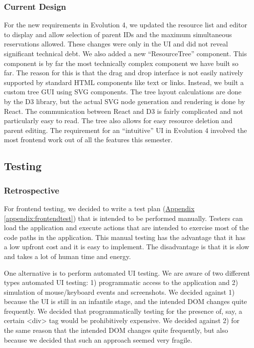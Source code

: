 \documentclass[12pt]{article}
\begin{document}
\subsubsection{Current Design}
For the new requirements in Evolution 4, we updated the resource list and editor to display and allow selection of parent IDs and the maximum simultaneous reservations allowed. These changes were only in the UI and did not reveal significant technical debt. We also added a new ``ResourceTree'' component. This component is by far the most technically complex component we have built so far. The reason for this is that the drag and drop interface is not easily natively supported by standard HTML components like text or links. Instead, we built a custom tree GUI using SVG components. The tree layout calculations are done by the D3 library, but the actual SVG node generation and rendering is done by React. The communication between React and D3 is fairly complicated and not particularly easy to read. The tree also allows for easy resource deletion and parent editing. The requirement for an ``intuitive'' UI in Evolution 4 involved the most frontend work out of all the features this semester.

\subsection{Testing}
\subsubsection{Retrospective}
For frontend testing, we decided to write a test plan (\hyperref[appendix:frontendtest]{Appendix \ref{appendix:frontendtest}}) that is intended to be performed manually. Testers can load the application and execute actions that are intended to exercise most of the code paths in the application. This manual testing has the advantage that it has a low upfront cost and it is easy to implement. The disadvantage is that it is slow and takes a lot of human time and energy.

One alternative is to perform automated UI testing. We are aware of two different types automated UI testing: 1) programmatic access to the application and 2) simulation of mouse/keyboard events and screenshots. We decided against 1) because the UI is still in an infantile stage, and the intended DOM changes quite frequently. We decided that programmatically testing for the presence of, say, a certain <div> tag would be prohibitively expensive. We decided against 2) for the same reason that the intended DOM changes quite frequently, but also because we decided that such an approach seemed very fragile.
\end{document}
